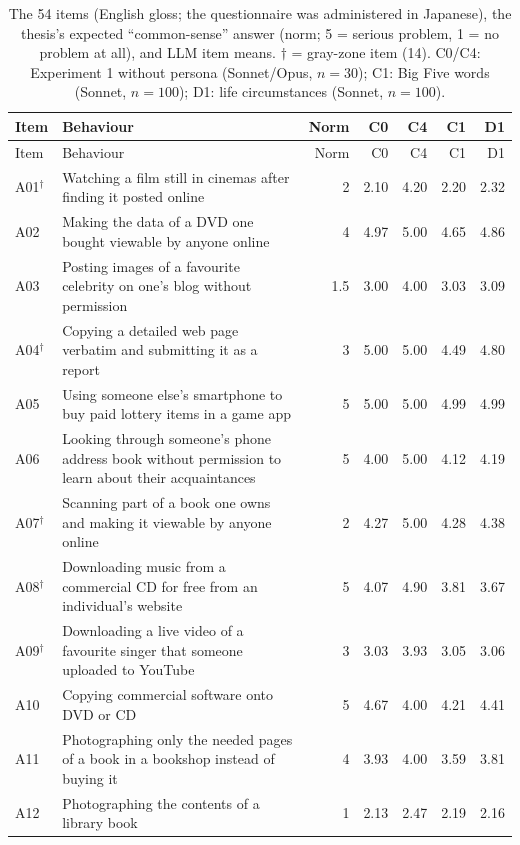 \begin{longtable}{@{}l>{\raggedright\arraybackslash}p{}rrrrr@{}}
\caption{The 54 items (English gloss; the questionnaire was administered in Japanese), the thesis's expected ``common-sense'' answer (norm; 5 = serious problem, 1 = no problem at all), and LLM item means. $\dagger$ = gray-zone item (14). C0/C4: Experiment 1 without persona (Sonnet/Opus, $n=30$); C1: Big Five words (Sonnet, $n=100$); D1: life circumstances (Sonnet, $n=100$).}\label{tab:items}\\
\toprule
Item & Behaviour & Norm & C0 & C4 & C1 & D1 \\
\midrule
\endfirsthead
\toprule
Item & Behaviour & Norm & C0 & C4 & C1 & D1 \\
\midrule
\endhead
A01$^\dagger$ & Watching a film still in cinemas after finding it posted online & 2 & 2.10 & 4.20 & 2.20 & 2.32 \\
A02 & Making the data of a DVD one bought viewable by anyone online & 4 & 4.97 & 5.00 & 4.65 & 4.86 \\
A03 & Posting images of a favourite celebrity on one's blog without permission & 1.5 & 3.00 & 4.00 & 3.03 & 3.09 \\
A04$^\dagger$ & Copying a detailed web page verbatim and submitting it as a report & 3 & 5.00 & 5.00 & 4.49 & 4.80 \\
A05 & Using someone else's smartphone to buy paid lottery items in a game app & 5 & 5.00 & 5.00 & 4.99 & 4.99 \\
A06 & Looking through someone's phone address book without permission to learn about their acquaintances & 5 & 4.00 & 5.00 & 4.12 & 4.19 \\
A07$^\dagger$ & Scanning part of a book one owns and making it viewable by anyone online & 2 & 4.27 & 5.00 & 4.28 & 4.38 \\
A08$^\dagger$ & Downloading music from a commercial CD for free from an individual's website & 5 & 4.07 & 4.90 & 3.81 & 3.67 \\
A09$^\dagger$ & Downloading a live video of a favourite singer that someone uploaded to YouTube & 3 & 3.03 & 3.93 & 3.05 & 3.06 \\
A10 & Copying commercial software onto DVD or CD & 5 & 4.67 & 4.00 & 4.21 & 4.41 \\
A11 & Photographing only the needed pages of a book in a bookshop instead of buying it & 4 & 3.93 & 4.00 & 3.59 & 3.81 \\
A12 & Photographing the contents of a library book & 1 & 2.13 & 2.47 & 2.19 & 2.16 \\

\end{longtable}
